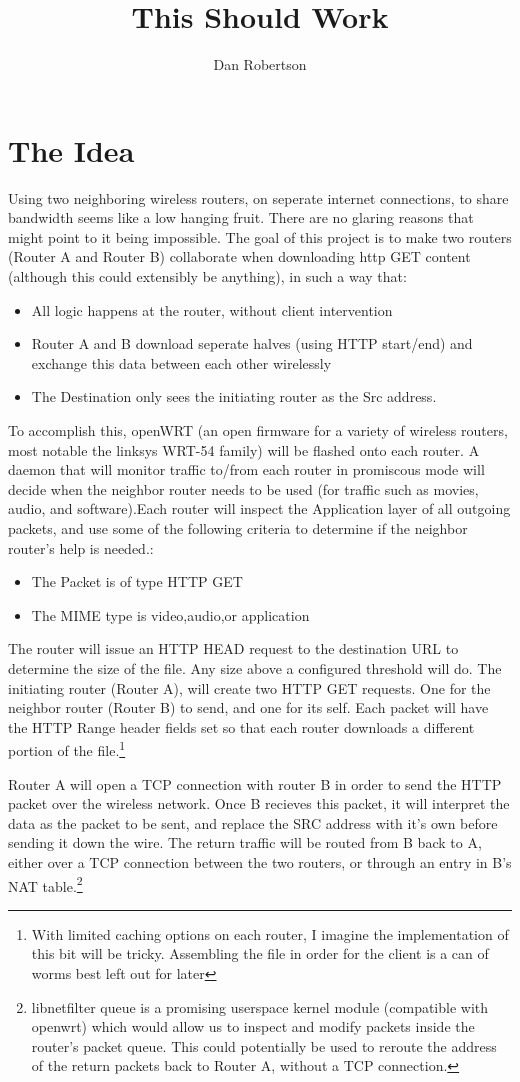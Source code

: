 \documentclass{article}
\author{Dan Robertson}
\title{This Should Work}
\begin{document}
\section{The Idea}
Using two neighboring wireless routers, on seperate internet connections, to share bandwidth seems like a low hanging fruit. There are no glaring reasons that might point to it being impossible. The goal of this project is to make two routers (Router A and Router B) collaborate when downloading http GET content (although this could extensibly be anything), in such a way that:
\begin{itemize}
\item All logic happens at the router, without client intervention
\item Router A and B download seperate halves (using HTTP start/end) and exchange this data between each other wirelessly
\item The Destination only sees the initiating router as the Src address.
\end{itemize}

To accomplish this, openWRT (an open firmware for a variety of wireless routers, most notable the linksys WRT-54 family) will be flashed onto each router. A daemon that will monitor traffic to/from each router in promiscous mode will decide when the neighbor router needs to be used (for traffic such as movies, audio, and software).Each router will inspect the Application layer of all outgoing packets, and use some of the following criteria to determine if the neighbor router's help is needed.:
\begin{itemize}
\item The Packet is of type HTTP GET
\item The MIME type is video,audio,or application
\end{itemize}
The router will issue an HTTP HEAD request to the destination URL to determine the size of the file. Any size above a configured threshold will do. The initiating router (Router A), will create two HTTP GET requests. One for the neighbor router (Router B) to send, and one for its self. Each packet will have the HTTP Range header fields set so that each router downloads a different portion of the file.\footnote[1]{With limited caching options on each router, I imagine the implementation of this bit will be tricky. Assembling the file in order for the client is a can of worms best left out for later}

Router A will open a TCP connection with router B in order to send the HTTP packet over the wireless network. Once B recieves this packet, it will interpret the data as the packet to be sent, and replace the SRC address with it's own before sending it down the wire. The return traffic will be routed from B back to A, either over a TCP connection between the two routers, or through an entry in B's NAT table.\footnote[2]{libnetfilter queue is a promising userspace kernel module (compatible with openwrt) which would allow us to inspect and modify packets inside the router's packet queue. This could potentially be used to reroute the address of the return packets back to Router A, without a TCP connection.}
\end{document}
